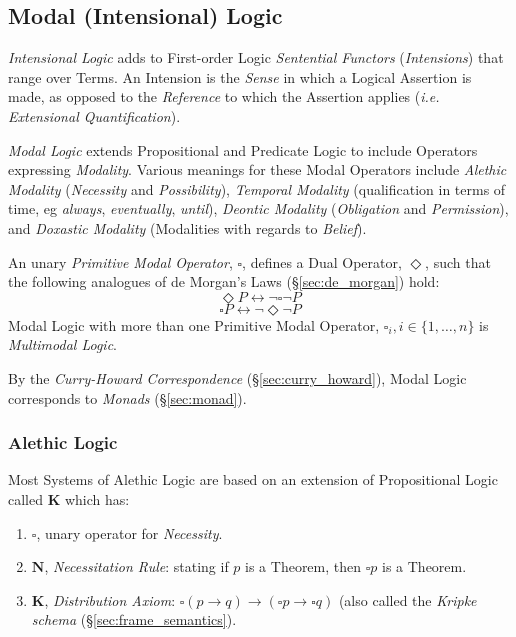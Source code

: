 \subsection{Modal (Intensional) Logic} \label{sec:modal_logic}

\emph{Intensional Logic} adds to First-order Logic \emph{Sentential
  Functors} (\emph{Intensions}) that range over Terms. An Intension is
the \emph{Sense} in which a Logical Assertion is made, as opposed to
the \emph{Reference} to which the Assertion applies (\emph{i.e.
  Extensional Quantification}).

\emph{Modal Logic} extends Propositional and Predicate Logic to
include Operators expressing \emph{Modality}. Various meanings for
these Modal Operators include \emph{Alethic Modality}
(\emph{Necessity} and \emph{Possibility}), \emph{Temporal Modality}
(qualification in terms of time, eg \emph{always}, \emph{eventually},
\emph{until}), \emph{Deontic Modality} (\emph{Obligation} and
\emph{Permission}), and \emph{Doxastic Modality} (Modalities with
regards to \emph{Belief}).

An unary \emph{Primitive Modal Operator}, $\square$, defines a Dual
Operator, $\Diamond$, such that the following analogues of de Morgan's
Laws (\S\ref{sec:de_morgan}) hold:
    \[\Diamond P \leftrightarrow \neg \square \neg P\]
    \[\square P \leftrightarrow \neg \Diamond \neg P\]
Modal Logic with more than one Primitive Modal Operator, $\square _i,
i \in \{1, \ldots, n\}$ is \emph{Multimodal Logic}.

By the \emph{Curry-Howard Correspondence}
(\S\ref{sec:curry_howard}), Modal Logic corresponds
to \emph{Monads} (\S\ref{sec:monad}).

\subsubsection{Alethic Logic}\label{sec:alethic_logic}

Most Systems of Alethic Logic are based on an extension of
Propositional Logic called $\mathbf{K}$ which has:

\begin{enumerate}
\item $\square$, unary operator for \emph{Necessity}.
\item $\mathbf{N}$, \emph{Necessitation Rule}: stating if $p$ is a
  Theorem, then $\square p$ is a Theorem.
\item $\mathbf{K}$, \emph{Distribution Axiom}: $\square(p \rightarrow
  q) \rightarrow (\square p \rightarrow \square q)$ (also called the
  \emph{Kripke schema} (\S\ref{sec:frame_semantics}).
\end{enumerate}


